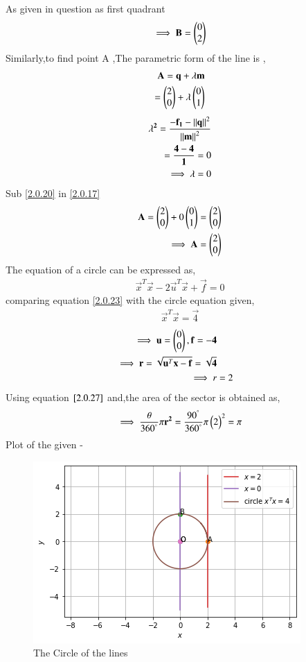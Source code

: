 \documentclass[journal,12pt,twocolumn]{IEEEtran}
\begin{document}
As given in question as first quadrant
\begin{align}
\implies \mathbf{B}=\begin{pmatrix}0\\2\end{pmatrix}   
\end{align}
Similarly,to find point A ,The parametric form of the line is ,
\begin{align}
 \mathbf{A}=\mathbf{q}+\lambda \mathbf{m}\\ =\begin{pmatrix}2\\0\end{pmatrix}+\lambda \begin{pmatrix}0\\1\end{pmatrix} \label{2.0.17}
\end{align}
\begin{align}
 \mathbf{\lambda^2}=\frac{{\mathbf{-f_1}-\left\lVert\mathbf{q}\right\rVert^2}}{{\left\lVert\mathbf{m}\right\rVert^2}}\\=\frac{{\mathbf{4}-\mathbf{4}}}{{\mathbf{1}}}=0
 \\
\implies \lambda=0 \label{2.0.20}
\end{align}
Sub \eqref{2.0.20} in \eqref{2.0.17}
\begin{align}
 \mathbf{A}=\begin{pmatrix}2 \\0\end{pmatrix}+0\begin{pmatrix}0\\1\end{pmatrix}=\begin{pmatrix}2\\0\end{pmatrix}
 \\
 \implies \mathbf{A}=\begin{pmatrix}2 \\ 0\end{pmatrix}
\end{align}
The equation of a circle can be expressed as,
\begin{align}
\vec{x}^T\vec{x} - 2\vec{u}^T\vec{x} + \vec{f}= 0
\label{2.0.19}
\end{align}
comparing equation \eqref{2.0.23} with the circle equation given,
\begin{align}
\vec{x}^T\vec{x} = \vec{4}
\end{align}
\begin{align}
\implies \mathbf{u}=\begin{pmatrix}0\\0\end{pmatrix},\mathbf{f}=\mathbf{-4}
\\
\implies \mathbf{r}=\sqrt{\mathbf{u}^T\mathbf{x}-\mathbf{f}}=\sqrt{\mathbf{4}}
\\
\implies r &=2 \label{2.0.27}
\end{align}
Using equation $\eqref{2.0.27}$ and,the area of the sector is obtained as,
\begin{align}
 \implies  \frac{\theta}{360^{\degree}}\pi\mathbf{r^2}=\frac{90^{\degree}}{360^{\degree}}\pi\begin{pmatrix}2\end{pmatrix}^2=\pi
\end{align}
Plot of the given -
\begin{figure}[!ht]
\centering
\includegraphics[width=\columnwidth]{Figure 5.png}
\caption{The Circle of the lines }
\label{fig:The circle of the lines}	\end{figure}
\end{document}

